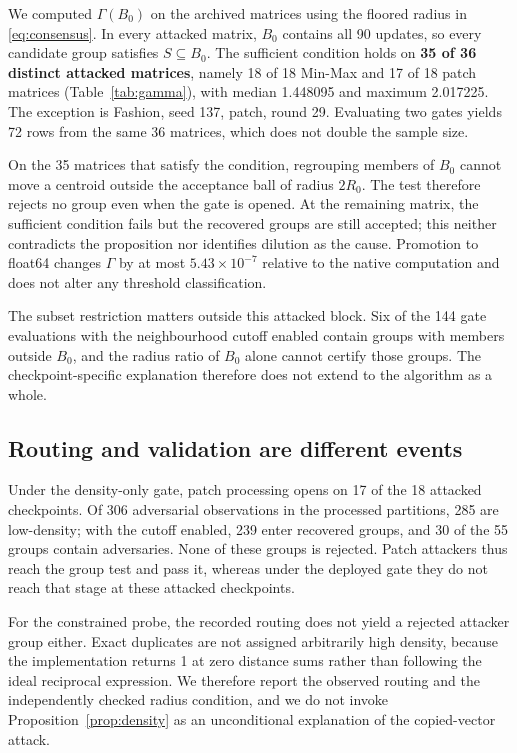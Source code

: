 \documentclass[journal]{IEEEtran}
\begin{document}

We computed $\Gamma(B_0)$ on the archived matrices using the floored radius in \eqref{eq:consensus}. In every attacked matrix, $B_0$ contains all 90 updates, so every candidate group satisfies $S\subseteq B_0$. The sufficient condition holds on \textbf{35 of 36 distinct attacked matrices}, namely 18 of 18 Min-Max and 17 of 18 patch matrices (Table~\ref{tab:gamma}), with median 1.448095 and maximum 2.017225. The exception is Fashion, seed 137, patch, round 29. Evaluating two gates yields 72 rows from the same 36 matrices, which does not double the sample size.

On the 35 matrices that satisfy the condition, regrouping members of $B_0$ cannot move a centroid outside the acceptance ball of radius $2R_0$. The test therefore rejects no group even when the gate is opened. At the remaining matrix, the sufficient condition fails but the recovered groups are still accepted; this neither contradicts the proposition nor identifies dilution as the cause. Promotion to float64 changes $\Gamma$ by at most $5.43\times10^{-7}$ relative to the native computation and does not alter any threshold classification.

The subset restriction matters outside this attacked block. Six of the 144 gate evaluations with the neighbourhood cutoff enabled contain groups with members outside $B_0$, and the radius ratio of $B_0$ alone cannot certify those groups. The checkpoint-specific explanation therefore does not extend to the algorithm as a whole.

\subsection{Routing and validation are different events}
Under the density-only gate, patch processing opens on 17 of the 18 attacked checkpoints. Of 306 adversarial observations in the processed partitions, 285 are low-density; with the cutoff enabled, 239 enter recovered groups, and 30 of the 55 groups contain adversaries. None of these groups is rejected. Patch attackers thus reach the group test and pass it, whereas under the deployed gate they do not reach that stage at these attacked checkpoints.

For the constrained probe, the recorded routing does not yield a rejected attacker group either. Exact duplicates are not assigned arbitrarily high density, because the implementation returns 1 at zero distance sums rather than following the ideal reciprocal expression. We therefore report the observed routing and the independently checked radius condition, and we do not invoke Proposition~\ref{prop:density} as an unconditional explanation of the copied-vector attack.
\end{document}
